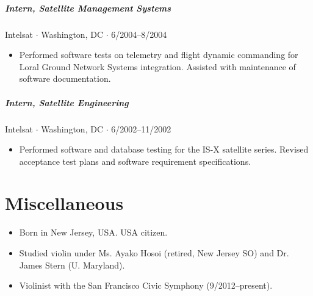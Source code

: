 \documentclass[10pt,letterpaper]{article}
\begin{document}
\subparagraph{Intern, Satellite Management Systems}
Intelsat $\cdot$ Washington, DC $\cdot$ 6/2004--8/2004
\begin{itemize}
    \item Performed software tests on telemetry and flight dynamic commanding for Loral Ground Network Systems integration. Assisted with maintenance of software documentation.
\end{itemize}

\subparagraph{Intern, Satellite Engineering}
Intelsat $\cdot$ Washington, DC $\cdot$ 6/2002--11/2002
\begin{itemize}
    \item Performed software and database testing for the IS-X satellite series. Revised acceptance test plans and software requirement specifications.
\end{itemize}


\section*{Miscellaneous}

\begin{itemize}
    \item Born in New Jersey, USA. USA citizen.
    \item Studied violin under Ms. Ayako Hosoi (retired, New Jersey SO) and Dr. James Stern (U. Maryland).
    \item Violinist with the San Francisco Civic Symphony (9/2012--present).
\end{itemize}

\fi
\end{document}
